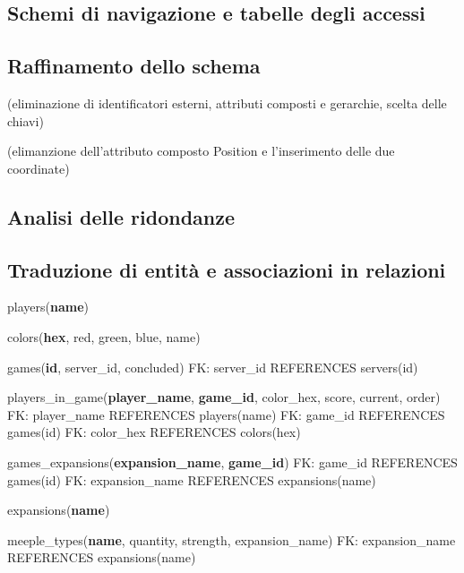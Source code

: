 \subsection{Schemi di navigazione e tabelle degli accessi}

\subsection{Raffinamento dello schema}
(eliminazione di identificatori esterni, attributi composti e gerarchie, scelta delle chiavi)
\medskip

(elimanzione dell'attributo composto Position e l'inserimento delle due coordinate)

\subsection{Analisi delle ridondanze}

\subsection{Traduzione di entità e associazioni in relazioni}
\hspace{1.5em}players(\textbf{name})\newline

colors(\textbf{hex}, red, green, blue, name)\newline

games(\textbf{id}, server\_id, concluded)\newline
FK: server\_id REFERENCES servers(id)\newline

players\_in\_game(\textbf{player\_name}, \textbf{game\_id}, color\_hex, score, current, order)\newline
FK: player\_name REFERENCES players(name)\newline
FK: game\_id REFERENCES games(id)\newline
FK: color\_hex REFERENCES colors(hex)\newline

games\_expansions(\textbf{expansion\_name}, \textbf{game\_id})\newline
FK: game\_id REFERENCES games(id)\newline
FK: expansion\_name REFERENCES expansions(name)\newline

expansions(\textbf{name})\newline

meeple\_types(\textbf{name}, quantity, strength, expansion\_name)\newline
FK: expansion\_name REFERENCES expansions(name)\newline

